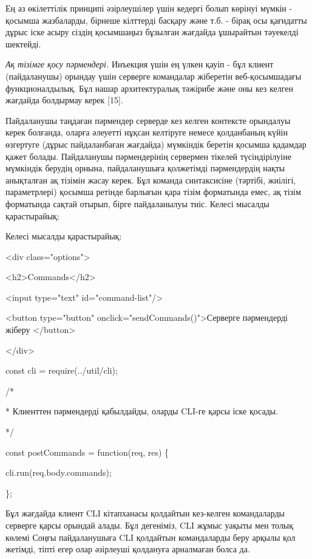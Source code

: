 Ең аз өкілеттілік принципі әзірлеушілер үшін кедергі болып көрінуі
мүмкін - қосымша жазбаларды, бірнеше кілттерді басқару және т.б. - бірақ
осы қағидатты дұрыс іске асыру сіздің қосымшаңыз бұзылған жағдайда
ұшырайтын тәуекелді шектейді.

\emph{Ақ тізімге қосу пәрмендері.} Инъекция үшін ең үлкен қауіп - бұл
клиент (пайдаланушы) орындау үшін серверге командалар жіберетін
веб-қосымшадағы функционалдылық. Бұл нашар архитектуралық тәжірибе және
оны кез келген жағдайда болдырмау керек {[}15{]}.

Пайдаланушы таңдаған пәрмендер серверде кез келген контексте орындалуы
керек болғанда, оларға әлеуетті нұқсан келтіруге немесе қолданбаның
күйін өзгертуге (дұрыс пайдаланбаған жағдайда) мүмкіндік беретін қосымша
қадамдар қажет болады. Пайдаланушы пәрмендерінің сервермен тікелей
түсіндірілуіне мүмкіндік берудің орнына, пайдаланушыға қолжетімді
пәрмендердің нақты анықталған ақ тізімін жасау керек. Бұл команда
синтаксисіне (тәртібі, жиілігі, параметрлері) қосымша ретінде барлығын
қара тізім форматында емес, ақ тізім форматында сақтай отырып, бірге
пайдаланылуы тиіс. Келесі мысалды қарастырайық:

Келесі мысалды қарастырайық:

\textless div class="options"\textgreater{}

\textless h2\textgreater Commands\textless/h2\textgreater{}

\textless input type="text" id="command-list"/\textgreater{}

\textless button type="button"
onclick="sendCommands()"\textgreater Серверге пәрмендерді жіберу
\textless/button\textgreater{}

\textless/div\textgreater{}

const cli = require(\textquotesingle../util/cli\textquotesingle);

/*

* Клиенттен пәрмендерді қабылдайды, оларды CLI-ге қарсы іске қосады.

*/

const postCommands = function(req, res) \{

cli.run(req.body.commands);

\};

Бұл жағдайда клиент CLI кітапханасы қолдайтын кез-келген командаларды
серверге қарсы орындай алады. Бұл дегеніміз, CLI жұмыс уақыты мен толық
көлемі Соңғы пайдаланушыға CLI қолдайтын командаларды беру арқылы қол
жетімді, тіпті егер олар әзірлеуші қолдануға арналмаған болса да.

